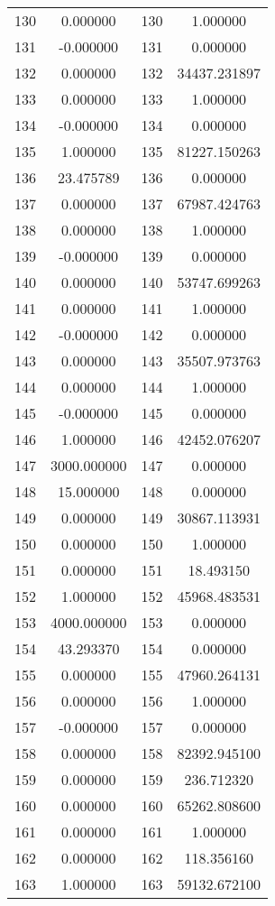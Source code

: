 \documentclass[12pt]{article}
\begin{document}
\begin{longtable}{@{}cccc@{}}
130 & 0.000000 & 130 & 1.000000 \\
131 & -0.000000 & 131 & 0.000000 \\
132 & 0.000000 & 132 & 34437.231897 \\
133 & 0.000000 & 133 & 1.000000 \\
134 & -0.000000 & 134 & 0.000000 \\
135 & 1.000000 & 135 & 81227.150263 \\
136 & 23.475789 & 136 & 0.000000 \\
137 & 0.000000 & 137 & 67987.424763 \\
138 & 0.000000 & 138 & 1.000000 \\
139 & -0.000000 & 139 & 0.000000 \\
140 & 0.000000 & 140 & 53747.699263 \\
141 & 0.000000 & 141 & 1.000000 \\
142 & -0.000000 & 142 & 0.000000 \\
143 & 0.000000 & 143 & 35507.973763 \\
144 & 0.000000 & 144 & 1.000000 \\
145 & -0.000000 & 145 & 0.000000 \\
146 & 1.000000 & 146 & 42452.076207 \\
147 & 3000.000000 & 147 & 0.000000 \\
148 & 15.000000 & 148 & 0.000000 \\
149 & 0.000000 & 149 & 30867.113931 \\
150 & 0.000000 & 150 & 1.000000 \\
151 & 0.000000 & 151 & 18.493150 \\
152 & 1.000000 & 152 & 45968.483531 \\
153 & 4000.000000 & 153 & 0.000000 \\
154 & 43.293370 & 154 & 0.000000 \\
155 & 0.000000 & 155 & 47960.264131 \\
156 & 0.000000 & 156 & 1.000000 \\
157 & -0.000000 & 157 & 0.000000 \\
158 & 0.000000 & 158 & 82392.945100 \\
159 & 0.000000 & 159 & 236.712320 \\
160 & 0.000000 & 160 & 65262.808600 \\
161 & 0.000000 & 161 & 1.000000 \\
162 & 0.000000 & 162 & 118.356160 \\
163 & 1.000000 & 163 & 59132.672100 \\

\end{longtable}
\end{document}
